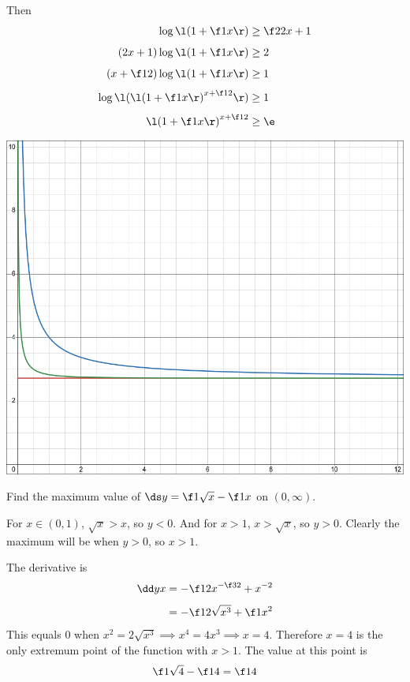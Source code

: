 \documentclass[a4paper]{article}
\begin{document}
Then \begin{align*}
\log\l( 1 + \f1x \r) &\ge \f2{2x+1} \\[1ex]
(2x+1) \log\l( 1 + \f1x \r) &\ge 2 \\[1ex]
(x + \f12) \log\l( 1 + \f1x \r) &\ge 1 \\[1ex]
\log \l( {\l( 1 + \f1x \r)}^{x + \f12} \r) &\ge 1 \\[1ex]
{\l( 1 + \f1x \r)}^{x + \f12} &\ge \e
\end{align*}

\begin{center}
    \includegraphics[scale=0.3]{Q1-graph.png}
\end{center}



\begin{questionbody}
Find the maximum value of $\ds y = \f1{\sqrt x} - \f1x$ on $(0, \infty)$.
\end{questionbody}

For $x \in (0,1)$, $\sqrt x > x$, so $y < 0$. And for $x > 1$, $x > \sqrt x$, so $y > 0$. Clearly the maximum will be when $y > 0$, so $x > 1$.

The derivative is \begin{align*}
\dd yx &= -\f12 x^{-\f32} + x^{-2} \\[1ex]
&= - \f1{2\sqrt{x^3}} + \f1{x^2}
\end{align*}
This equals 0 when $x^2 = 2 \sqrt{x^3} \implies x^4 = 4x^3 \implies x = 4$. Therefore $x = 4$ is the only extremum point of the function with $x > 1$. The value at this point is \[ \f1{\sqrt 4} - \f14 = \f14 \]
\end{document}
